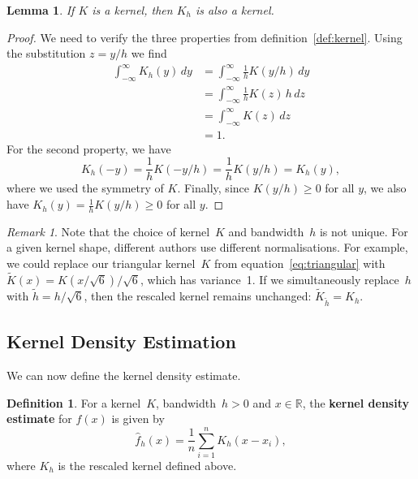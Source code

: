 \documentclass[
  a4paper,
]{article}
\newtheorem{lemma}{Lemma}[section]
\theoremstyle{definition}
\newtheorem{definition}{Definition}[section]
\theoremstyle{definition}
\theoremstyle{definition}
\theoremstyle{definition}
\theoremstyle{remark}
\newtheorem*{remark}{Remark}
\begin{document}
\begin{lemma}
\protect\hypertarget{lem:Kh-kernel}{}\label{lem:Kh-kernel}If \(K\) is a kernel, then \(K_h\) is also a kernel.
\end{lemma}

\begin{proof}
We need to verify the three properties from definition~\ref{def:kernel}.
Using the substitution \(z = y/h\) we find
\begin{align*}
  \int_{-\infty}^\infty K_h(y) \,dy
  &= \int_{-\infty}^\infty \frac{1}{h} K(y/h) \,dy \\
  &= \int_{-\infty}^\infty \frac{1}{h} K(z) \,h \,dz \\
  &= \int_{-\infty}^\infty K(z) \,dz \\
  &= 1.
\end{align*}
For the second property, we have
\begin{equation*}
  K_h(-y)
  = \frac{1}{h} K(-y/h)
  = \frac{1}{h} K(y/h)
  = K_h(y),
\end{equation*}
where we used the symmetry of \(K\).
Finally, since \(K(y/h) \geq 0\) for all \(y\), we also have \(K_h(y) = \frac{1}{h} K(y/h) \geq 0\)
for all \(y\).
\end{proof}

\begin{remark}
Note that the choice of kernel~\(K\) and bandwidth~\(h\) is not unique. For a given
kernel shape, different authors use different normalisations. For example, we
could replace our triangular kernel~\(K\) from equation~\eqref{eq:triangular}
with \(\tilde K(x) = K(x/\sqrt{6}) / \sqrt{6}\), which has variance~1. If we
simultaneously replace~\(h\) with \(\tilde h = h/\sqrt{6}\), then the rescaled
kernel remains unchanged: \(\tilde K_{\tilde h} = K_h\).
\end{remark}

\subsection{Kernel Density Estimation}\label{kernel-density-estimation}

We can now define the kernel density estimate.

\begin{definition}
\protect\hypertarget{def:KDE}{}\label{def:KDE}For a kernel~\(K\), bandwidth~\(h > 0\) and \(x \in \mathbb{R}\), the
\textbf{kernel density estimate} for \(f(x)\) is given by
\begin{equation*}
  \hat f_h(x)
  = \frac{1}{n} \sum_{i=1}^n K_h(x - x_i),
\end{equation*}
where \(K_h\) is the rescaled kernel defined above.
\end{definition}
\end{document}
